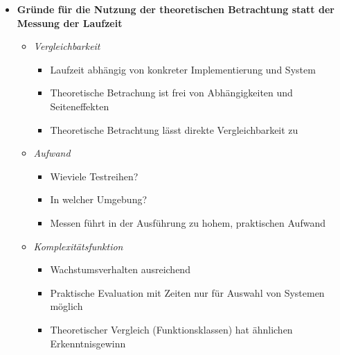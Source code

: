 \documentclass[
    12pt,
    a4paper,
    ngerman,
    color=3b,%
    marginpar=false,
    colorback=false,
    leqno,
]{tudaexercise}
\begin{document}
\begin{itemize}
    \item \textbf{Gründe für die Nutzung der theoretischen Betrachtung statt der Messung der Laufzeit }
          \begin{itemize}
              \item \textit{Vergleichbarkeit}
                    \begin{itemize}
                        \item Laufzeit abhängig von konkreter Implementierung und System
                        \item Theoretische Betrachung ist frei von Abhängigkeiten und Seiteneffekten
                        \item Theoretische Betrachtung lässt direkte Vergleichbarkeit zu
                    \end{itemize}

              \item \textit{Aufwand}
                    \begin{itemize}
                        \item Wieviele Testreihen?
                        \item In welcher Umgebung?
                        \item Messen führt in der Ausführung zu hohem, praktischen Aufwand
                    \end{itemize}

              \item \textit{Komplexitätsfunktion}
                    \begin{itemize}
                        \item Wachstumsverhalten ausreichend
                        \item Praktische Evaluation mit Zeiten nur für Auswahl von Systemen möglich
                        \item Theoretischer Vergleich (Funktionsklassen) hat ähnlichen Erkenntnisgewinn
                    \end{itemize}
          \end{itemize}
\end{itemize}
\clearpage
\end{document}
